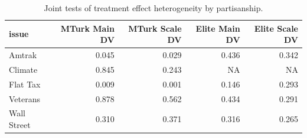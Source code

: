 \begin{table}[!h]
\centering
\caption{Joint tests of treatment effect heterogeneity by partisanship.}
\centering
\begin{tabular}[t]{lrrrr}
\toprule
issue & MTurk Main DV & MTurk Scale DV & Elite Main DV & Elite Scale DV\\
\midrule
Amtrak & 0.045 & 0.029 & 0.436 & 0.342\\
Climate & 0.845 & 0.243 & NA & NA\\
Flat Tax & 0.009 & 0.001 & 0.146 & 0.293\\
Veterans & 0.878 & 0.562 & 0.434 & 0.291\\
Wall Street & 0.310 & 0.371 & 0.316 & 0.265\\
\bottomrule
\end{tabular}
\end{table}
